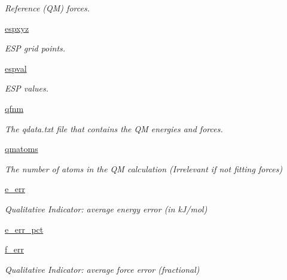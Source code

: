 \begin{DoxyCompactItemize}
\begin{DoxyCompactList}\small\item\em \-Reference (\-Q\-M) forces. \end{DoxyCompactList}\item 
\hyperlink{classforcebalance_1_1abinitio_1_1AbInitio_ae86f6ee41ce05057b44fb1bc8bb1282b}{espxyz}
\begin{DoxyCompactList}\small\item\em \-E\-S\-P grid points. \end{DoxyCompactList}\item 
\hyperlink{classforcebalance_1_1abinitio_1_1AbInitio_a011b973a1779275fe19fd1c72037b435}{espval}
\begin{DoxyCompactList}\small\item\em \-E\-S\-P values. \end{DoxyCompactList}\item 
\hyperlink{classforcebalance_1_1abinitio_1_1AbInitio_af8f5ab3fd98876e7ea923ed90c48e66d}{qfnm}
\begin{DoxyCompactList}\small\item\em \-The qdata.\-txt file that contains the \-Q\-M energies and forces. \end{DoxyCompactList}\item 
\hyperlink{classforcebalance_1_1abinitio_1_1AbInitio_a45edac867fa720c26a6f959c3dd5a139}{qmatoms}
\begin{DoxyCompactList}\small\item\em \-The number of atoms in the \-Q\-M calculation (\-Irrelevant if not fitting forces) \end{DoxyCompactList}\item 
\hyperlink{classforcebalance_1_1abinitio_1_1AbInitio_a003717f2442aac7d1067e74b89a14cc7}{e\-\_\-err}
\begin{DoxyCompactList}\small\item\em \-Qualitative \-Indicator\-: average energy error (in k\-J/mol) \end{DoxyCompactList}\item 
\hyperlink{classforcebalance_1_1abinitio_1_1AbInitio_ac04e91428155e8d5c4a1a14328e9cc99}{e\-\_\-err\-\_\-pct}
\item 
\hyperlink{classforcebalance_1_1abinitio_1_1AbInitio_a2df838b5d83710d5d35e3ccccbf7c656}{f\-\_\-err}
\begin{DoxyCompactList}\small\item\em \-Qualitative \-Indicator\-: average force error (fractional) \end{DoxyCompactList}\item 

\end{DoxyCompactItemize}
